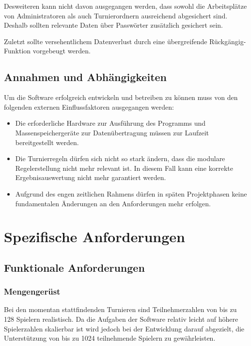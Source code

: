 \documentclass[11pt]{article}
\begin{document}
Desweiteren kann nicht davon ausgegangen werden, dass sowohl die Arbeitsplätze von Administratoren als auch Turnierordnern ausreichend abgesichert sind. Deshalb sollten relevante Daten über Passwörter zusätzlich gesichert sein.

Zuletzt sollte versehentlichem Datenverlust durch eine übergreifende Rückgängig-Funktion vorgebeugt werden.

\subsection{Annahmen und Abhängigkeiten}

Um die Software erfolgreich entwickeln und betreiben zu können muss von den folgenden externen Einflussfaktoren ausgegangen werden:
\begin{itemize}
	\item Die erforderliche Hardware zur Ausführung des Programms und Massenspeichergeräte zur Datenübertragung müssen zur Laufzeit bereitgestellt werden.
	\item Die Turnierregeln dürfen sich nicht so stark ändern, dass die modulare Regelerstellung nicht mehr relevant ist. In diesem Fall kann eine korrekte Ergebnisauswertung nicht mehr garantiert werden.
	\item Aufgrund des engen zeitlichen Rahmens dürfen in späten Projektphasen keine fundamentalen Änderungen an den Anforderungen mehr erfolgen.
\end{itemize}

\section{Spezifische Anforderungen}

\subsection{Funktionale Anforderungen}

\subsubsection{Mengengerüst}

Bei den momentan stattfindenden Turnieren sind Teilnehmerzahlen von bis zu 128 Spielern realistisch. Da die Aufgaben der Software relativ leicht auf höhere Spielerzahlen skalierbar ist wird jedoch bei der Entwicklung darauf abgezielt, die Unterstützung von bis zu 1024 teilnehmende Spielern zu gewährleisten.
\end{document}
